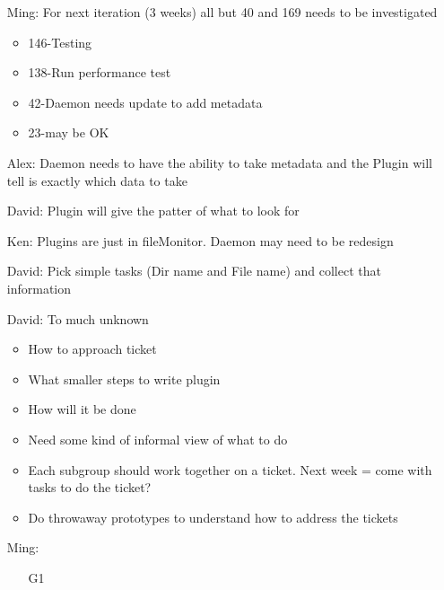 \documentclass[a4paper,10pt]{article}
\begin{document}
\begin{enumerate}
\item[Ming:] For next iteration (3 weeks) all but 40 and 169 needs to be investigated\begin{itemize}
                                                                                      \item 146-Testing
                                                                                      \item 138-Run performance test
                                                                                      \item 42-Daemon needs update to add metadata
                                                                                      \item 23-may be OK
                                                                                     \end{itemize}
\item[Alex:] Daemon needs to have the ability to take metadata and the Plugin will tell is exactly which data to take
\item[David:] Plugin will give the patter of what to look for
\item[Ken:] Plugins are just in fileMonitor.  Daemon may need to be redesign
\item[David:] Pick simple tasks (Dir name and File name) and collect that information
\item[David:] To much unknown \begin{itemize}
                              \item How to approach ticket
                              \item What smaller steps to write plugin
                              \item How will it be done
                              \item Need some kind of informal view of what to do
                              \item Each subgroup should work together on a ticket.  Next week = come with tasks to do the ticket?
                              \item Do throwaway prototypes to understand how to address the tickets
                             \end{itemize}
\item[Ming:]\begin{itemize}
             \item[G1]\begin{itemize}

\end{itemize}
\end{itemize}
\end{enumerate}
\end{document}
